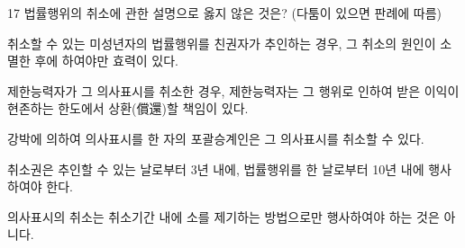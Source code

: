 \begin{question}{17}
법률행위의 취소에 관한 설명으로 옳지 않은 것은? (다툼이 있으면 판례에 따름)
\begin{choices}
  \item 취소할 수 있는 미성년자의 법률행위를 친권자가 추인하는 경우, 그 취소의 원인이 소멸한 후에 하여야만 효력이 있다.
  \item 제한능력자가 그 의사표시를 취소한 경우, 제한능력자는 그 행위로 인하여 받은 이익이 현존하는 한도에서 상환(償還)할 책임이 있다.
  \item 강박에 의하여 의사표시를 한 자의 포괄승계인은 그 의사표시를 취소할 수 있다.
  \item 취소권은 추인할 수 있는 날로부터 3년 내에, 법률행위를 한 날로부터 10년 내에 행사하여야 한다.
  \item 의사표시의 취소는 취소기간 내에 소를 제기하는 방법으로만 행사하여야 하는 것은 아니다.
\end{choices}
\end{question}
